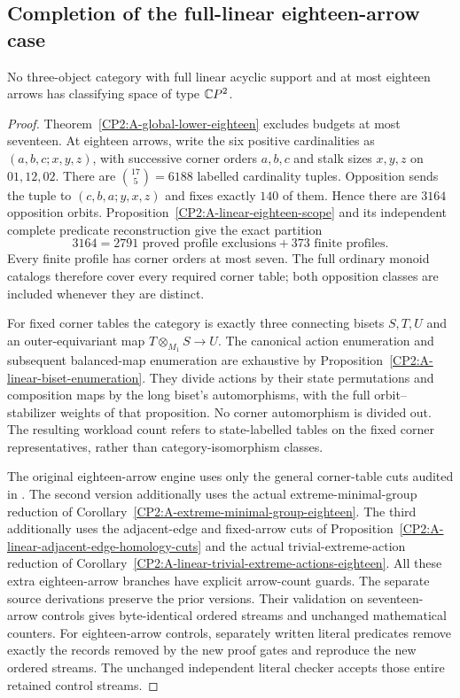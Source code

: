 \subsection{Completion of the full-linear eighteen-arrow case}

\begin{theorem}
\label{CP2:A-linear-eighteen-complete}
No three-object category with full linear acyclic support
and at most eighteen arrows has classifying space of type
$\mathbb{C}P^2$.
\end{theorem}
\begin{proof}
Theorem~\ref{CP2:A-global-lower-eighteen} excludes budgets
at most seventeen.  At eighteen arrows, write the six
positive cardinalities as $(a,b,c;x,y,z)$, with successive
corner orders $a,b,c$ and stalk sizes $x,y,z$ on $01,12,02$.
There are $\binom{17}{5}=6188$ labelled cardinality tuples.
Opposition sends the tuple to $(c,b,a;y,x,z)$ and fixes
exactly $140$ of them.  Hence there are $3164$ opposition
orbits.  Proposition~\ref{CP2:A-linear-eighteen-scope}
and its independent complete predicate reconstruction
give the exact partition
\[
 3164=2791\text{ proved profile exclusions}
          +373\text{ finite profiles}.
\]
Every finite profile has corner orders at most seven.
The full ordinary monoid catalogs therefore cover every
required corner table; both opposition classes are
included whenever they are distinct.

For fixed corner tables the category is exactly three
connecting bisets $S,T,U$ and an outer-equivariant map
$T\otimes_{M_1}S\to U$.  The canonical action enumeration
and subsequent balanced-map enumeration are exhaustive
by Proposition~\ref{CP2:A-linear-biset-enumeration}.
They divide actions by their state permutations and
composition maps by the long biset's automorphisms,
with the full orbit--stabilizer weights of that
proposition.  No corner automorphism is divided out.
The resulting workload count refers to state-labelled
tables on the fixed corner representatives, rather
than category-isomorphism classes.

The original eighteen-arrow engine uses only the general
corner-table cuts audited in
.
The second version additionally uses the actual
extreme-minimal-group reduction of
Corollary~\ref{CP2:A-extreme-minimal-group-eighteen}.
The third additionally uses the adjacent-edge and fixed-arrow
cuts of Proposition~\ref{CP2:A-linear-adjacent-edge-homology-cuts}
and the actual trivial-extreme-action reduction of
Corollary~\ref{CP2:A-linear-trivial-extreme-actions-eighteen}.
All these extra eighteen-arrow branches have explicit
arrow-count guards.  The separate source derivations
preserve the prior versions.  Their validation on
seventeen-arrow controls gives byte-identical ordered
streams and unchanged mathematical counters.  For
eighteen-arrow controls, separately written literal
predicates remove exactly the records removed by the
new proof gates and reproduce the new ordered streams.
The unchanged independent literal checker accepts
those entire retained control streams.


\end{proof}
